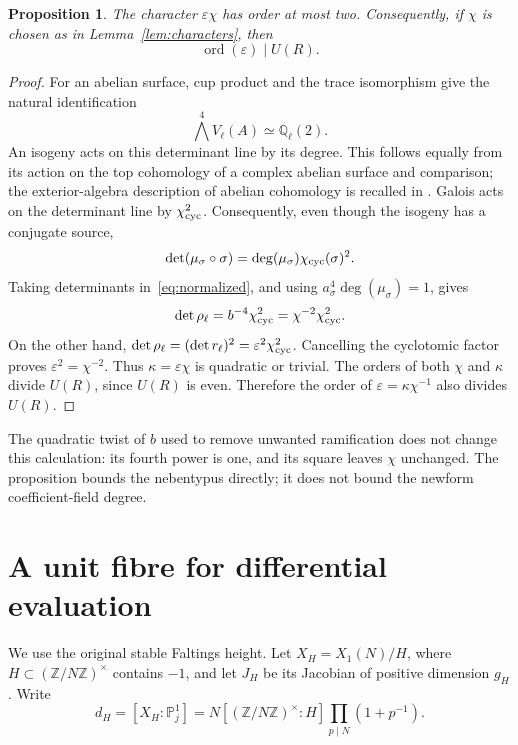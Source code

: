 \documentclass[11pt,a4paper]{article}
\newtheorem{proposition}[theorem]{Proposition}
\theoremstyle{definition}\newtheorem{remark}[theorem]{Remark}
\newcommand{\Q}{\mathbb Q}\newcommand{\Z}{\mathbb Z}
\newcommand{\ord}{\operatorname{ord}}
\begin{document}
\begin{proposition}\label{prop:determinant}
The character $\varepsilon\chi$ has order at most two. Consequently,
if $\chi$ is chosen as in Lemma~\ref{lem:characters}, then
\[
                         \ord(\varepsilon)\mid U(R).
\]
\end{proposition}
\begin{proof}
For an abelian surface, cup product and the trace isomorphism give
the natural identification
\[
                   \bigwedge^4 V_\ell(A)\simeq\Q_\ell(2).
\]
An isogeny acts on this determinant line by its degree. This follows
equally from its action on the top cohomology of a complex abelian
surface and comparison; the exterior-algebra description of abelian
cohomology is recalled in \cite[Chapter~I, Section~12]{Milne}.
Galois acts on the determinant line by $\chi_{\rm cyc}^2$.
Consequently, even though the isogeny has a conjugate source,
\[
 \det(\mu_\sigma\circ\sigma)
      =\deg(\mu_\sigma)\chi_{\rm cyc}(\sigma)^2.
\]
Taking determinants in~\eqref{eq:normalized}, and using
$a_\sigma^4\deg(\mu_\sigma)=1$, gives
\[
 \det\rho_\ell=b^{-4}\chi_{\rm cyc}^2
                 =\chi^{-2}\chi_{\rm cyc}^2.
\]
On the other hand,
$\det\rho_\ell=(\det r_\ell)^2
 =\varepsilon^2\chi_{\rm cyc}^2$.
Cancelling the cyclotomic factor proves
$\varepsilon^2=\chi^{-2}$. Thus
$\kappa=\varepsilon\chi$ is quadratic or trivial.
The orders of both $\chi$ and $\kappa$ divide $U(R)$, since $U(R)$
is even. Therefore the order of $\varepsilon=\kappa\chi^{-1}$
also divides $U(R)$.
\end{proof}

The quadratic twist of $b$ used to remove unwanted ramification
does not change this calculation: its fourth power is one, and its
square leaves $\chi$ unchanged. The proposition bounds the
nebentypus directly; it does not bound the newform coefficient-field
degree.

\section{A unit fibre for differential evaluation}

We use the original stable Faltings height. Let $X_H=X_1(N)/H$, where
$H\subset(\Z/N\Z)^\times$ contains $-1$, and let $J_H$ be its
Jacobian of positive dimension $g_H$. Write
\[
 d_H=[X_H:\mathbb P^1_j]
       =N[(\Z/N\Z)^\times:H]\prod_{p\mid N}(1+p^{-1}).
\]
\end{document}
